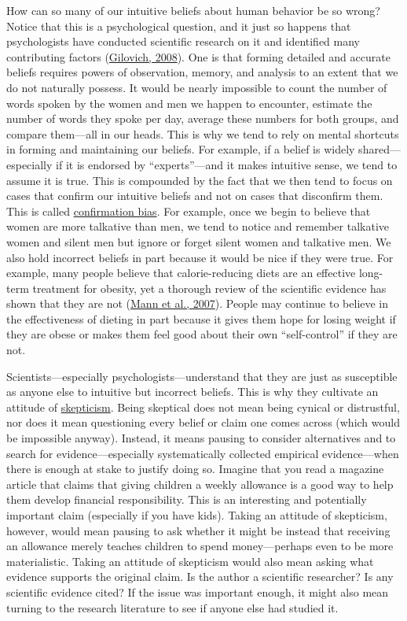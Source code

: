 \documentclass[
]{krantz}
\begin{document}
How can so many of our intuitive beliefs about human behavior be so wrong? Notice that this is a psychological question, and it just so happens that psychologists have conducted scientific research on it and identified many contributing factors (\protect\hyperlink{ref-gilovich2008we}{Gilovich, 2008}). One is that forming detailed and accurate beliefs requires powers of observation, memory, and analysis to an extent that we do not naturally possess. It would be nearly impossible to count the number of words spoken by the women and men we happen to encounter, estimate the number of words they spoke per day, average these numbers for both groups, and compare them---all in our heads. This is why we tend to rely on mental shortcuts in forming and maintaining our beliefs. For example, if a belief is widely shared---especially if it is endorsed by ``experts''---and it makes intuitive sense, we tend to assume it is true. This is compounded by the fact that we then tend to focus on cases that confirm our intuitive beliefs and not on cases that disconfirm them. This is called \protect\hyperlink{confirmation-bias}{confirmation bias}. For example, once we begin to believe that women are more talkative than men, we tend to notice and remember talkative women and silent men but ignore or forget silent women and talkative men. We also hold incorrect beliefs in part because it would be nice if they were true. For example, many people believe that calorie-reducing diets are an effective long-term treatment for obesity, yet a thorough review of the scientific evidence has shown that they are not (\protect\hyperlink{ref-mann2007medicare}{Mann et al., 2007}). People may continue to believe in the effectiveness of dieting in part because it gives them hope for losing weight if they are obese or makes them feel good about their own ``self-control'' if they are not.

Scientists---especially psychologists---understand that they are just as susceptible as anyone else to intuitive but incorrect beliefs. This is why they cultivate an attitude of \protect\hyperlink{skepticism}{skepticism}. Being skeptical does not mean being cynical or distrustful, nor does it mean questioning every belief or claim one comes across (which would be impossible anyway). Instead, it means pausing to consider alternatives and to search for evidence---especially systematically collected empirical evidence---when there is enough at stake to justify doing so. Imagine that you read a magazine article that claims that giving children a weekly allowance is a good way to help them develop financial responsibility. This is an interesting and potentially important claim (especially if you have kids). Taking an attitude of skepticism, however, would mean pausing to ask whether it might be instead that receiving an allowance merely teaches children to spend money---perhaps even to be more materialistic. Taking an attitude of skepticism would also mean asking what evidence supports the original claim. Is the author a scientific researcher? Is any scientific evidence cited? If the issue was important enough, it might also mean turning to the research literature to see if anyone else had studied it.
\end{document}
